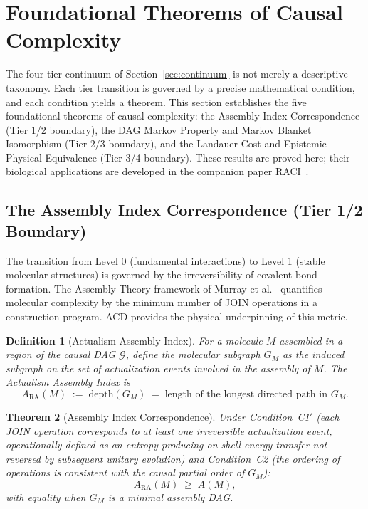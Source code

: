 \documentclass[11pt,a4paper]{article}
\newtheorem{theorem}{Theorem}[section]
\newtheorem{definition}[theorem]{Definition}
\theoremstyle{remark}
\newcommand{\GM}{G_{M}}
\newcommand{\ARA}{A_{\mathrm{RA}}}
\newcommand{\GG}{\mathcal{G}}
\begin{document}
\section{Foundational Theorems of Causal Complexity}
\label{sec:theorems}

The four-tier continuum of Section~\ref{sec:continuum} is not merely a
descriptive taxonomy. Each tier transition is governed by a precise mathematical
condition, and each condition yields a theorem. This section establishes the five
foundational theorems of causal complexity: the Assembly Index Correspondence
(Tier 1/2 boundary), the DAG Markov Property and Markov Blanket Isomorphism
(Tier 2/3 boundary), and the Landauer Cost and Epistemic-Physical Equivalence
(Tier 3/4 boundary). These results are proved here; their biological applications
are developed in the companion paper RACI~\citep{Sandeman2026c}.

\subsection{The Assembly Index Correspondence (Tier 1/2 Boundary)}
\label{sec:assembly_rahc}

The transition from Level 0 (fundamental interactions) to Level 1 (stable
molecular structures) is governed by the irreversibility of covalent bond
formation. The Assembly Theory framework of Murray et al.~\citep{Murray2023}
quantifies molecular complexity by the minimum number of JOIN operations in a
construction program. ACD provides the physical underpinning of this metric.

\begin{definition}[Actualism Assembly Index]
For a molecule $M$ assembled in a region of the causal DAG $\GG$, define the
\emph{molecular subgraph} $\GM$ as the induced subgraph on the set of
actualization events involved in the assembly of $M$. The Actualism Assembly
Index is
\begin{equation}
  \ARA(M) \;:=\; \mathrm{depth}(\GM)
  \;=\; \text{length of the longest directed path in } \GM.
  \label{eq:ara}
\end{equation}
\end{definition}

\begin{theorem}[Assembly Index Correspondence]
\label{thm:assembly}
Under Condition~C1$'$ (each JOIN operation corresponds to at least one irreversible
actualization event, operationally defined as an entropy-producing on-shell energy
transfer not reversed by subsequent unitary evolution) and Condition~C2 (the
ordering of operations is consistent with the causal partial order of $\GM$):
\begin{equation}
  \ARA(M) \;\geq\; A(M),
\end{equation}
with equality when $\GM$ is a minimal assembly DAG.
\end{theorem}
\end{document}
